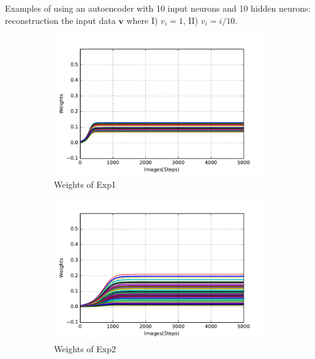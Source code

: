 Examples of using an autoencoder with 10 input neurons and 10 hidden neurons: reconstruction the input data $\mathbf{v}$ where I) $v_i = 1$, II) $v_i = i/10$.
	\begin{figure}
		\centering
		\begin{subfigure}[t]{0.4\textwidth}
			\includegraphics[width=\textwidth]{pics_sdlm/20_exp_AE/exp1_weights_non.pdf}
			\caption{Weights of Exp1}
		\end{subfigure}
		\begin{subfigure}[t]{0.4\textwidth}
			\includegraphics[width=\textwidth]{pics_sdlm/20_exp_AE/exp2_weights_non.pdf}
			\caption{Weights of Exp2}
		\end{subfigure}
		\begin{subfigure}[t]{0.4\textwidth}

\end{subfigure}
\end{figure}
